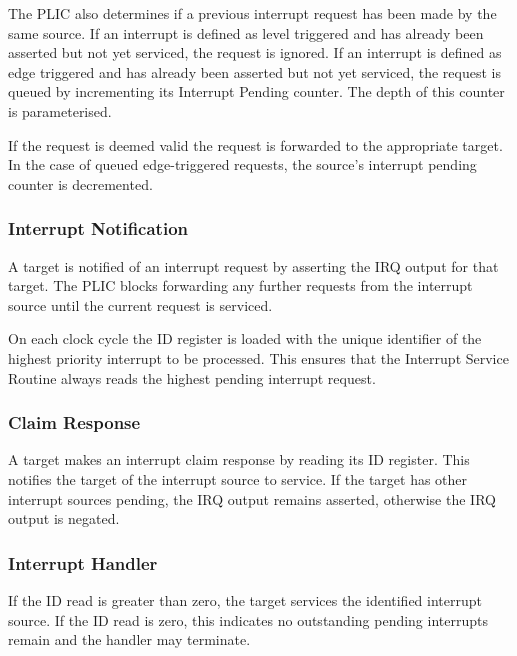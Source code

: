 The PLIC also determines if a previous interrupt request has been made by the same source.
If an interrupt is defined as level triggered and has already been asserted but not yet serviced, the request is ignored.
If an interrupt is defined as edge triggered and has already been asserted but not yet serviced, the request is queued by incrementing its Interrupt Pending counter.
The depth of this counter is parameterised.

If the request is deemed valid the request is forwarded to the appropriate target.
In the case of queued edge-triggered requests, the source's interrupt pending counter is decremented.

\subsubsection{Interrupt Notification}

A target is notified of an interrupt request by asserting the IRQ output for that target.
The PLIC blocks forwarding any further requests from the interrupt source until the current request is serviced.

On each clock cycle the ID register is loaded with the unique identifier of the highest priority interrupt to be processed.
This ensures that the Interrupt Service Routine always reads the highest pending interrupt request.

\subsubsection{Claim Response} \label{sec:claim-response}

A target makes an interrupt claim response by reading its ID register.
This notifies the target of the interrupt source to service.
If the target has other interrupt sources pending, the IRQ output remains asserted, otherwise the IRQ output is negated.


\subsubsection{Interrupt Handler}

If the ID read is greater than zero, the target services the identified interrupt source.
If the ID read is zero, this indicates no outstanding pending interrupts remain and the handler may terminate.

